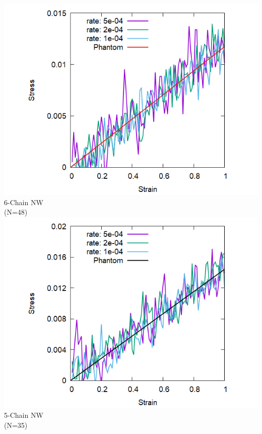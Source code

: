 \documentclass[aspectratio=169,11pt, dvipdfmx]{beamer}
\begin{document}
\begin{frame}
\begin{columns}[T, onlytextwidth]
		\centering
		\includegraphics[width=\textwidth]{Shear_Random_6chain_N48.png}
		6-Chain NW \\(N=48)
		\centering
			\includegraphics[width=\textwidth]{Shear_Random_5chain_N35.png}
			5-Chain NW \\(N=35)
	\end{columns}
\end{frame}
\end{document}
